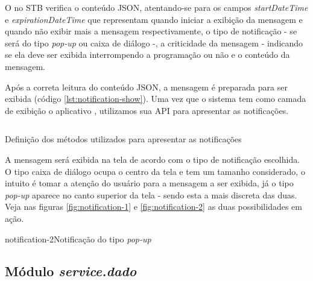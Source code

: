 O \software[] no STB verifica o conteúdo JSON, atentando-se para os campos 
\textit{startDateTime} e \textit{expirationDateTime} que representam quando 
iniciar a exibição da mensagem e quando não exibir mais a mensagem 
respectivamente, o tipo de notificação - se será do tipo \textit{pop-up} ou
caixa de diálogo -, a criticidade da mensagem - indicando se ela deve ser
exibida interrompendo a programação ou não e o conteúdo da mensagem. 

Após a correta leitura do conteúdo JSON, a mensagem é preparada para ser 
exibida (código \ref{lst:notification-show}). Uma vez que o sistema tem como 
camada de exibição o aplicativo \xbmc[], utilizamos sua API para apresentar as 
notificações.

\begin{listing}[ht!]
\inputminted{python}{codigos/notification-show.py}
\caption{Definição dos métodos utilizados para apresentar as notificações}
\label{lst:notification-show}
\end{listing}

A mensagem será exibida na tela de acordo com o tipo de notificação escolhida. O
tipo caixa de diálogo ocupa o centro da tela e tem um tamanho considerado, o 
intuito é tomar a atenção do usuário para a mensagem a ser exibida, já o tipo
\textit{pop-up} aparece no canto superior da tela - sendo esta a mais discreta 
das duas. Veja nas figuras \ref{fig:notification-1} e \ref{fig:notification-2} 
as duas possibilidades em ação.

{notification-2}{Notificação do tipo \textit{pop-up}}

\subsection{Módulo \textit{service.dado}}
